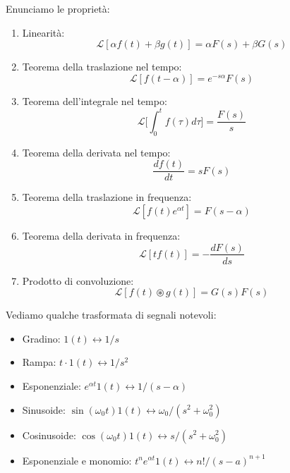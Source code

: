 Enunciamo le proprietà:
\begin{enumerate}
	\item Linearità:
	\begin{equation}
		\mathcal{L}[\alpha f(t) + \beta g(t)] = \alpha F(s) + \beta G(s)
	\end{equation}
	\item Teorema della traslazione nel tempo:
	\begin{equation}
		\mathcal{L}[f(t - \alpha)] = e^{-s \alpha} F(s)
	\end{equation}
	\item Teorema dell'integrale nel tempo:
	\begin{equation}
		\mathcal{L} \Biggl[ \int_0^t f(\tau) d \tau \Biggr] = \frac{F(s)}{s}
	\end{equation}
	\item Teorema della derivata nel tempo:
	\begin{equation}
		\frac{d f(t)}{dt} = sF(s)
	\end{equation}
	\item Teorema della traslazione in frequenza:
	\begin{equation}
		\mathcal{L}[f(t) e^{\alpha t}] = F(s - \alpha )
	\end{equation}
	\item Teorema della derivata in frequenza:
	\begin{equation}
		\mathcal{L}[t f(t)] = - \frac{d F(s)}{ds}
	\end{equation}
	\item Prodotto di convoluzione:
	\begin{equation}
		\mathcal{L}[f(t) \circledast g(t)] = G(s) F(s)
	\end{equation}
\end{enumerate}

Vediamo qualche trasformata di segnali notevoli:
\begin{itemize}
	\item Gradino: $1(t) \longleftrightarrow 1/s $
	\item Rampa: $t\cdot 1(t) \longleftrightarrow 1/s^2$
	\item Esponenziale: $e^{\alpha t}1(t) \longleftrightarrow 1/(s - \alpha)$
	\item Sinusoide: $\sin(\omega_0 t) 1(t) \longleftrightarrow \omega_0/ (s^2 + \omega_0^2)$
	\item Cosinusoide: $\cos(\omega_0 t) 1(t) \longleftrightarrow s/ (s^2 + \omega_0^2)$
	\item Esponenziale e monomio: $t^n e^{\alpha t} 1(t) \longleftrightarrow n! / (s-a)^{n+1}$
\end{itemize}
